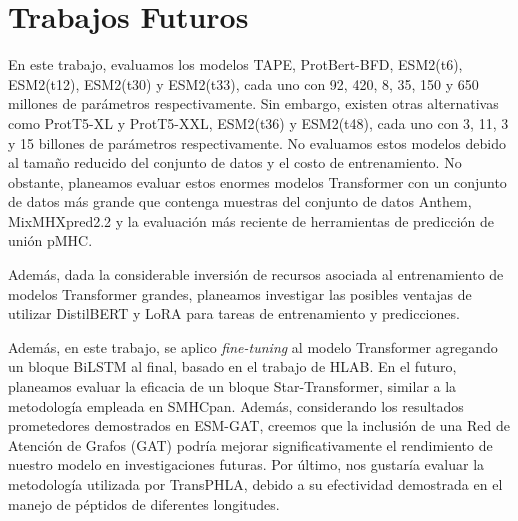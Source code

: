 \section{Trabajos Futuros}
En este trabajo, evaluamos los modelos TAPE, ProtBert-BFD, ESM2(t6), ESM2(t12), ESM2(t30) y ESM2(t33), cada uno con 92, 420, 8, 35, 150 y 650 millones de parámetros respectivamente. Sin embargo, existen otras alternativas como ProtT5-XL y ProtT5-XXL, ESM2(t36) y ESM2(t48), cada uno con 3, 11, 3 y 15 billones de parámetros respectivamente. No evaluamos estos modelos debido al tamaño reducido del conjunto de datos y el costo de entrenamiento. No obstante, planeamos evaluar estos enormes modelos Transformer con un conjunto de datos más grande que contenga muestras del conjunto de datos Anthem, MixMHXpred2.2 y la evaluación más reciente de herramientas de predicción de unión pMHC.

Además, dada la considerable inversión de recursos asociada al entrenamiento de modelos Transformer grandes, planeamos investigar las posibles ventajas de utilizar DistilBERT y LoRA para tareas de entrenamiento y predicciones.

Además, en este trabajo, se aplico \textit{fine-tuning} al modelo Transformer agregando un bloque BiLSTM al final, basado en el trabajo de HLAB. En el futuro, planeamos evaluar la eficacia de un bloque Star-Transformer, similar a la metodología empleada en SMHCpan. Además, considerando los resultados prometedores demostrados en ESM-GAT, creemos que la inclusión de una Red de Atención de Grafos (GAT) podría mejorar significativamente el rendimiento de nuestro modelo en investigaciones futuras. Por último, nos gustaría evaluar la metodología utilizada por TransPHLA, debido a su efectividad demostrada en el manejo de péptidos de diferentes longitudes.